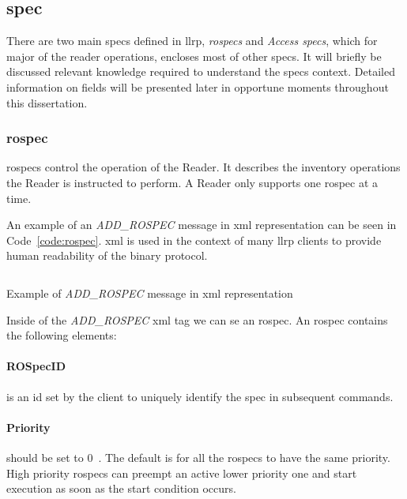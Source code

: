 \subsection{\acf{spec}}

There are two main \acp{spec} defined in \ac{llrp}, \textit{\acp{rospec}} and \textit{Access \acp{spec}}, which for major of the reader operations, encloses most of other \acp{spec}.
It will briefly be discussed relevant knowledge required to understand the \acp{spec} context. Detailed information on fields will be presented later in opportune moments throughout this dissertation.

\subsubsection{\acf{rospec}}

\acp{rospec} control the operation of the Reader. It describes the inventory operations the Reader is instructed to perform.
A Reader only supports one \ac{rospec} at a time.

An example of an \textit{ADD\_ROSPEC} message in \ac{xml} representation can be seen in Code~\ref{code:rospec}. \ac{xml} is used in the context of many \ac{llrp} clients to provide human readability of the binary protocol.

\begin{listing}
    \inputminted[linenos]{xml}{./code/sota/llrp_messages/ROSPEC.xml}
    \caption{Example of \textit{ADD\_ROSPEC} message in \ac{xml} representation}
    \label{code:rospec}
\end{listing}

Inside of the \textit{ADD\_ROSPEC} \ac{xml} tag we can se an \ac{rospec}.
An \ac{rospec} contains the following elements:

\paragraph{ROSpecID} is an \ac{id} set by the client to uniquely identify the spec in subsequent commands.

\paragraph{Priority} should be set to $0$~\cite{ImpinjLTKProgrammers}. The default is for all the \acp{rospec} to have the same priority. High priority \acp{rospec} can preempt an active lower priority one and start execution as soon as the start condition occurs.

